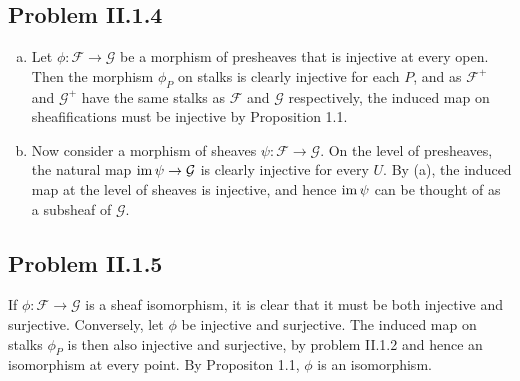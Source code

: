 \documentclass{mathnotes}
\begin{document}
\subsection*{Problem II.1.4}
\begin{enumerate}[(a)]
    \item Let $\phi:\mathcal{F}\to\mathcal{G}$ be a morphism of presheaves that is injective at every open.
        Then the morphism $\phi_P$ on stalks is clearly injective for each $P$, and as $\mathcal{F}^+$ and $\mathcal{G}^+$
        have the same stalks as $\mathcal{F}$ and $\mathcal{G}$ respectively, the induced map on sheafifications
        must be injective by Proposition 1.1.
    \item Now consider a morphism of sheaves $\psi:\mathcal{F}\to\mathcal{G}$. On the level of presheaves, the natural
        map $\operatorname{im}\psi\to\mathcal{G}$ is clearly injective for every $U$. By (a), the induced map at the level
        of sheaves is injective, and hence $\operatorname{im}\psi$ can be thought of as a subsheaf of $\mathcal{G}$.
\end{enumerate}

\subsection*{Problem II.1.5}
If $\phi:\mathcal{F}\to\mathcal{G}$ is a sheaf isomorphism, it is clear that it must be both injective and surjective.
Conversely, let $\phi$ be injective and surjective. The induced map on stalks $\phi_P$ is then also injective and surjective,
by problem II.1.2 and hence an isomorphism at every point. By Propositon 1.1, $\phi$ is an isomorphism.
\end{document}
